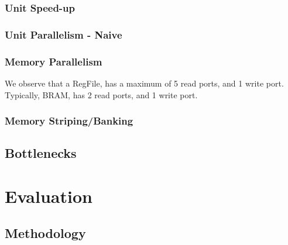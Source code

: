 \documentclass[a4paper,9pt]{report}
\begin{document}



\subsection{Unit Speed-up}
\subsection{Unit Parallelism - Naive}

\subsection{Memory Parallelism}

We observe that a RegFile, has a maximum of 5 read ports, and 1 write port.
Typically, BRAM, has 2 read ports, and 1 write port.


\subsection{Memory Striping/Banking}


\section{Bottlenecks}

\chapter{Evaluation} 
\section{Methodology}
\end{document}
